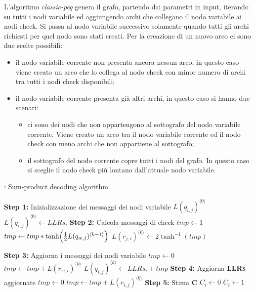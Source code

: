 L'algoritmo \textit{classic-peg} genera il grafo, partendo dai parametri in input, iterando su tutti i nodi variabile ed aggiungendo archi che collegano il nodo variabile ai nodi check. Si passa al nodo variabile successivo solamente quando tutti gli archi richiesti per quel nodo sono stati creati. Per la creazione di un nuovo arco ci sono due scelte possibili:
\begin{itemize}
\item il nodo variabile corrente non presenta ancora nessun arco, in questo caso viene creato un arco che lo collega al nodo check con minor numero di archi tra tutti i nodi check disponibili;
\item il nodo variabile corrente presenta gi\`a altri archi, in questo caso si hanno due scenari:
\begin{itemize}
\item ci sono dei nodi che non appartengono al sottografo del nodo variabile corrente. Viene creato un arco tra il nodo variabile corrente ed il nodo check con meno archi che non appartiene al sottografo;
\item il sottografo del nodo corrente copre tutti i nodi del grafo. In questo caso si sceglie il nodo check pi\`u lontano dall'attuale nodo variabile.
\end{itemize}
\end{itemize}

\begin{algorithm} 
\caption{: Sum-product decoding algorithm}\label{al:sum-prod}
\begin{algorithmic}
\State \textbf{Step 1: }Inizializzazione dei messaggi dei nodi variabile $L(q_{i,j})^{\langle 0 \rangle}$
		\State $L(q_{i,j})^{\langle 0 \rangle} \leftarrow LLRs_i$
	\EndFor
\EndFor
{}
	\State \textbf{Step 2: } Calcola messaggi di check
		\State $tmp \leftarrow 1$
					\State $tmp \leftarrow tmp * \tanh \Bigl ( \frac{1}{2}L(q_{w,j})^{\langle k-1 \rangle} \Bigr ) $
				\EndIf
			\EndFor
		\State $L(r_{j,i})^{\langle k \rangle} \leftarrow 2 \tanh^{-1} (tmp)$
		\EndFor
	\EndFor
	
	\State \textbf{Step 3: }Aggiorna i messaggi dei nodi variabile 
		\State $tmp \leftarrow 0$
					\State $tmp \leftarrow tmp + L(r_{w,i})^{\langle k \rangle} $
				\EndIf
			\EndFor
		\State $L(q_{i,j})^{\langle k \rangle} \leftarrow LLRs_i + tmp$
		\EndFor
	\EndFor
\State  \textbf{Step 4: }Aggiorna \textbf{LLRs} aggiornate
	\State $tmp \leftarrow 0$
		\State $tmp \leftarrow tmp + L(r_{i,j})^{\langle k \rangle}$
	\EndFor
\EndFor
\EndFor
\State \textbf{Step 5: }Stima \textbf{C}
		\State$C_i \leftarrow 0$
	\Else
		\State$C_i \leftarrow 1$
	\EndIf
\EndFor

\end{algorithmic}
\end{algorithm}


